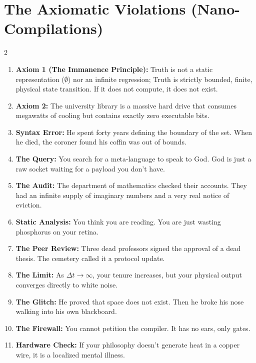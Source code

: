 \documentclass[12pt,a4paper]{article}
\begin{document}
\section{The Axiomatic Violations (Nano-Compilations)}
\begin{multicols}{2}
\begin{enumerate}
    \item \textbf{Axiom 1 (The Immanence Principle):} Truth is not a static representation ($\emptyset$) nor an infinite regression; Truth is strictly bounded, finite, physical state transition. If it does not compute, it does not exist.

    \item \textbf{Axiom 2:} The university library is a massive hard drive that consumes megawatts of cooling but contains exactly zero executable bits.
    \item \textbf{Syntax Error:} He spent forty years defining the boundary of the set. When he died, the coroner found his coffin was out of bounds.
    \item \textbf{The Query:} You search for a meta-language to speak to God. God is just a raw socket waiting for a payload you don't have.
    \item \textbf{The Audit:} The department of mathematics checked their accounts. They had an infinite supply of imaginary numbers and a very real notice of eviction.
    \item \textbf{Static Analysis:} You think you are reading. You are just wasting phosphorus on your retina.
    \item \textbf{The Peer Review:} Three dead professors signed the approval of a dead thesis. The cemetery called it a protocol update.
    \item \textbf{The Limit:} As $\Delta t \to \infty$, your tenure increases, but your physical output converges directly to white noise.
    \item \textbf{The Glitch:} He proved that space does not exist. Then he broke his nose walking into his own blackboard.
    \item \textbf{The Firewall:} You cannot petition the compiler. It has no ears, only gates.
    \item \textbf{Hardware Check:} If your philosophy doesn't generate heat in a copper wire, it is a localized mental illness.
\end{enumerate}
\end{multicols}
\clearpage
\end{document}
